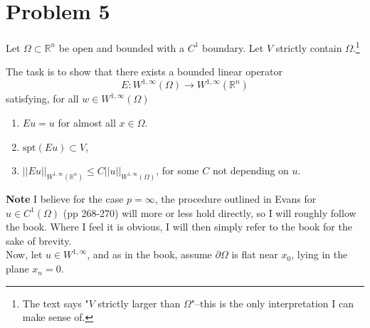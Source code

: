 \documentclass[11pt]{amsart}
\theoremstyle{definition}
\newcommand{\R}{\mathbb{R}}
\numberwithin{equation}{section}
\begin{document}
\section{Problem 5}
\newcommand{\spt}{\text{spt}}
\newcommand{\wnorm}[2]{||#1||_{W^{1,\infty}(#2)}}
Let $\Omega \subset \R^n$ be open and bounded with a $C^1$ boundary. Let $V$ strictly contain $\Omega$.\footnote{The text says "$V$ strictly larger than $\Omega$"--this is the only interpretation I can make sense of.}

The task is to show that there exists a bounded linear operator 
\begin{equation}
E: W^{1,\infty}(\Omega) \to W^{1,\infty}(\R^n)
\end{equation}
satisfying, for all $w \in W^{1,\infty}(\Omega)$
\begin{enumerate}
\item $Eu = u$ for almost all $x\in\Omega$.
\item $\spt(Eu) \subset V$,
\item $\wnorm{Eu}{\R^n} \leq C\wnorm{u}{\Omega}$,
for some $C$ not depending on $u$.\\
\end{enumerate}

\textbf{Note}
I believe for the case $p = \infty$, the procedure outlined in Evans for $u \in C^1(\Omega)$ (pp 268-270) will more or less hold directly, so I will roughly follow the book. Where I feel it is obvious, I will then simply refer to the book for the sake of brevity.
\\
Now, let $u \in W^{1,\infty}$, and as in the book, assume $\partial \Omega$ is flat near $x_0$, lying in the plane $x_n = 0$.
\end{document}
